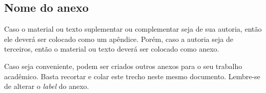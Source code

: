 \begin{anexosenv}

\chapter{Nome do anexo}     %
\label{chap:anexoA}

Caso o material ou texto suplementar ou complementar seja de sua autoria, então ele deverá ser colocado como um apêndice. Porém, caso a autoria seja de terceiros, então o material ou texto deverá ser colocado como anexo.

Caso seja conveniente, podem ser criados outros anexos para o seu trabalho acadêmico. Basta recortar e colar este trecho neste mesmo documento. Lembre-se de alterar o \textit{label} do anexo.


\end{anexosenv}
